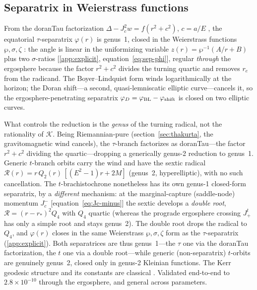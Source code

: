 \documentclass[12pt]{iopart}
\theoremstyle{plain}
\theoremstyle{definition}
\theoremstyle{remark}
\newcommand{\re}{r_{e}}
\newcommand{\Jc}{J_{c}}
\begin{document}
\subsection{Separatrix in Weierstrass functions}
\label{sec:separatrix}
From the doranTau factorization $\Delta-\Jc^2 w=f(r^2+c^2)$, $c=a/E$
\cite{RosignoliKerr}, the
equatorial $\tau$-separatrix $\varphi(r)$ is genus~1, closed in the
Weierstrass functions $\wp,\sigma,\zeta$
\cite{WhittakerWatson,DLMF,Hackmann2008,Hackmann2010}: the angle is linear in the
uniformizing variable $z(r)=\wp^{-1}(A/r+B)$ plus two $\sigma$-ratios
[\ref{app:explicit}, equation~\eqref{eq:sep-phi}], regular \emph{through} the
ergosphere because the factor $r^2+c^2$ divides the turning quartic and removes
$\re$ from the radicand. The Boyer--Lindquist form winds logarithmically at the
horizon; the Doran shift---a second, quasi-lemniscatic elliptic
curve---cancels it, so the ergosphere-penetrating separatrix
$\varphi_D=\varphi_{\rm BL}-\varphi_{\rm shift}$ is closed on two elliptic curves.

What controls the reduction is the \emph{genus} of the turning radical, not the
rationality of $\mathcal K$. Being Riemannian-pure
(section~\ref{sec:thakurta}, the gravitomagnetic wind cancels), the $\tau$-branch
factorizes as doranTau---the factor $r^2+c^2$ dividing the quartic---dropping a
generically genus-2 reduction to genus~1. Generic $t$-branch orbits carry the
wind and have the sextic radical
$\mathcal R(r)=r\,Q_2(r)\,[(E^2-1)r+2M]$ (genus~2, hyperelliptic), with no such
cancellation. The $t$-brachistochrone nonetheless has its own genus-1 closed-form
separatrix, by a \emph{different} mechanism: at the marginal-capture (saddle-node)
momentum $J_c^-$ [equation~\eqref{eq:Jc-minus}] the sextic develops a \emph{double
root}, $\mathcal R=(r-r_*)^2 Q_4$ with $Q_4$ quartic (whereas the prograde
ergosphere crossing $J_+^t$ has only a simple root and stays genus~2). The double
root drops the radical to $Q_4$, and $\varphi(r)$ closes in the same
Weierstrass $\wp,\sigma,\zeta$ form as the $\tau$-separatrix
(\ref{app:explicit}). Both separatrices are thus genus~1---the $\tau$ one
via the doranTau factorization, the $t$ one via a double root---while generic
(non-separatrix) $t$-orbits are genuinely genus~2, closed only in genus-2
Kleinian functions.
The Kerr geodesic structure and its constants are classical
\cite{Carter1968,Chandrasekhar}. Validated end-to-end to
$2.8\times10^{-10}$ through the ergosphere, and general across parameters.
\end{document}
